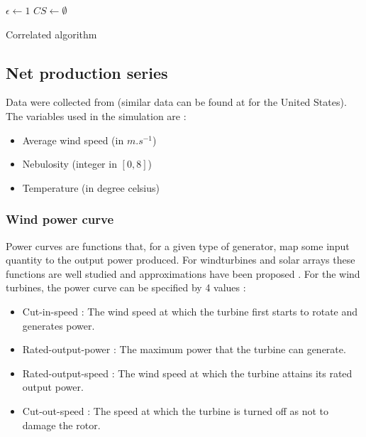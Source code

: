 \documentclass[conference]{IEEEtran}
\begin{document}
\begin{algorithm}
 $ \epsilon \leftarrow 1 $ \;
 $ CS \leftarrow \emptyset $\;
 \caption{Correlated algorithm}
\label{alg:algo3}
\end{algorithm}


\subsection{Net production series}

Data were collected from \cite{Infoclimat} (similar data can be found at \cite{NCDC} for the United States). The variables used in the simulation are :

\begin{itemize}
\item Average wind speed (in $m.s^{-1}$)
\item Nebulosity (integer in $[0,8] $)
\item Temperature (in degree celsius)
\end{itemize} 

\subsubsection{Wind power curve}
Power curves are functions that, for a given type of generator, map some input quantity to the output power produced. For windturbines and solar arrays these functions are well studied and approximations have been proposed \cite{Lydia2014} \cite{Dans2007}. For the wind turbines, the power curve can be specified by 4 values :

\begin{itemize}
\item Cut-in-speed : The wind speed at which the turbine first starts to rotate and generates power.
\item Rated-output-power : The maximum power that the turbine can generate.
\item Rated-output-speed : The wind speed at which the turbine attains its rated output power.
\item Cut-out-speed : The speed at which the turbine is turned off as not to damage the rotor.
\end{itemize}
\end{document}

